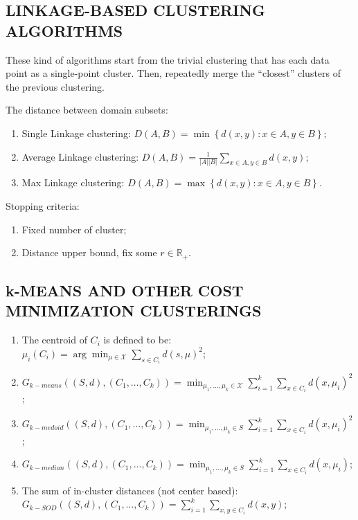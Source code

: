 \subsection{LINKAGE-BASED CLUSTERING ALGORITHMS}%
\label{sub:linkage_based_clustering_algorithms}

These kind of algorithms start from the trivial clustering that has each data point as a single-point cluster.
Then, repeatedly merge the ``closest'' clusters of the previous clustering. 

The distance between domain subsets:
\begin{enumerate}
    \item Single Linkage clustering: $ D(A, B) = \min \left\{ d(x, y): x \in A, y \in B \right\} $;
    \item Average Linkage clustering: $ D(A, B) = \frac{1}{\left| A \right| \left| B \right|} \sum^{}_{x \in A, y \in B}  d(x, y) $;
    \item Max Linkage clustering: $ D(A, B) = \max\left\{ d(x, y): x \in A, y \in B \right\} $.
\end{enumerate}

Stopping criteria:
\begin{enumerate}
    \item Fixed number of cluster;
    \item Distance upper bound, fix some $ r \in \mathbb{R}_+ $.
\end{enumerate}

\subsection{k-MEANS AND OTHER COST MINIMIZATION CLUSTERINGS}%

\begin{enumerate}
    \item The centroid of $ C_i $ is defined to be: $ \mu_i(C_i) =  \arg\min_{\mu \in \mathcal{X}} \sum^{}_{s \in C_i} {d(s, \mu)}^2$;
    \item $ G_{k-means}((S, d), (C_1, \ldots, C_k)) = \min_{\mu_1,\ldots, \mu_k \in \mathcal{X}} \sum^{k}_{i=1} \sum^{}_{ x \in C_i} {d(x, \mu_i)}^2 $;
    \item $ G_{k-medoid}((S, d), (C_1, \ldots, C_k)) = \min_{\mu_1, \ldots, \mu_k \in S} \sum^{k}_{i=1} \sum^{}_{x \in C_i} {d(x, \mu_i)}^2 $;
    \item $ G_{k-median}((S, d), (C_1, \ldots, C_k)) = \min_{\mu_1, \ldots, \mu_k \in S} \sum^{k}_{i=1} \sum^{}_{x \in C_i} {d(x, \mu_i)} $;
    \item The sum of in-cluster distances (not center based): $ G_{k-SOD}((S, d), (C_1, \ldots, C_k)) = \sum^{k}_{i=1} \sum^{}_{x, y \in C_i} {d(x, y)} $;
\end{enumerate}

